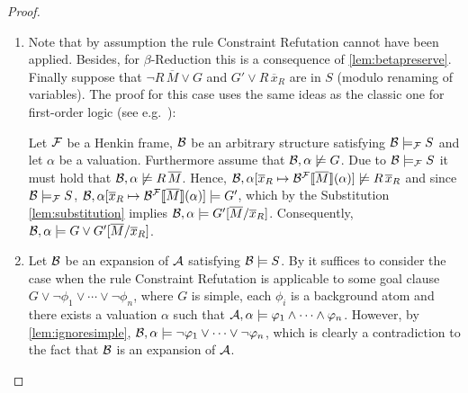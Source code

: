 \documentclass[a4paper,twoside,notitlepage,openright,11pt]{report}
\begin{document}
\begin{proof}
  \begin{enumerate}
  \item Note that by assumption the rule Constraint Refutation cannot have been applied. Besides, for $\beta$-Reduction this is a consequence of \cref{lem:betapreserve}. Finally suppose that $\neg R\,\overline M\lor G$ and $G'\lor R\,\overline x_R$ are in $S$ (modulo renaming of variables). The proof for this case uses the same ideas as the classic one for first-order logic (see e.g.\ \cite{R65,F96}):

    Let $\mathcal F$ be a Henkin frame, $\mathcal B$ be an arbitrary structure satisfying $\mathcal B\models_\mathcal F S$ and let $\alpha$ be a valuation. Furthermore assume that $\mathcal B,\alpha\not\models G$. Due to $\mathcal B\models_\mathcal F S$ it must hold that $\mathcal B,\alpha\not\models R\,\overline M$. Hence, $\mathcal B,\alpha[\overline x_R\mapsto{\mathcal B}^\mathcal F\llbracket\overline M\rrbracket(\alpha)]\not\models R\,\overline x_R$ and %
    since $\mathcal B\models_\mathcal F S$, $\mathcal B,\alpha[\overline x_R\mapsto{\mathcal B}^\mathcal F\llbracket\overline M\rrbracket(\alpha)]\models G'$, which by the Substitution \cref{lem:substitution} implies $\mathcal B,\alpha\models G'[\overline M/\overline x_R]$. Consequently, $\mathcal B,\alpha\models G\lor G'[\overline M/\overline x_R]$.
  \item Let $\mathcal B$ be an expansion of $\mathcal A$ satisfying $\mathcal B\models S$. By  it suffices to consider the case when the rule Constraint Refutation is applicable to some goal clause $G\lor\neg\phi_1\lor\cdots\lor\neg\phi_n$, where $G$ is simple, each $\phi_i$ is a background atom and there exists a valuation $\alpha$ such that $\mathcal A,\alpha\models\varphi_1\land\cdots\land\varphi_n$. However, by \cref{lem:ignoresimple}, $\mathcal B,\alpha\models\neg\varphi_1\lor\cdots\lor\neg\varphi_n$, which is clearly a contradiction to the fact that $\mathcal B$ is an expansion of $\mathcal A$.\qedhere
  \end{enumerate}
\end{proof}
\end{document}
